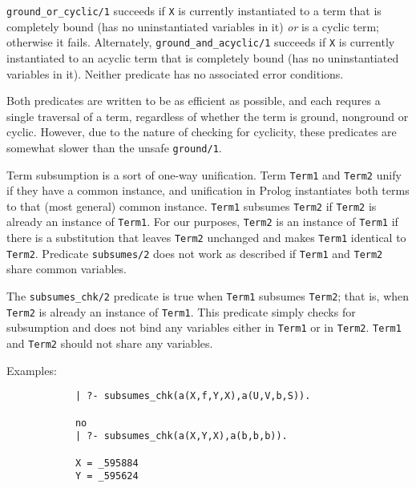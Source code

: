 \begin{description}
%
{\tt ground\_or\_cyclic/1} succeeds if {\tt X} is currently
instantiated to a term that is completely bound (has no uninstantiated
variables in it) {\em or} is a cyclic term; otherwise it fails.
Alternately, {\tt ground\_and\_acyclic/1} succeeds if {\tt X} is
currently instantiated to an acyclic term that is completely bound
(has no uninstantiated variables in it).  Neither predicate has no
associated error conditions.

Both predicates are written to be as efficient as possible, and each
requres a single traversal of a term, regardless of whether the term
is ground, nonground or cyclic.  However, due to the nature of
checking for cyclicity, these predicates are somewhat slower than the
unsafe {\tt ground/1}.

    Term subsumption is a sort of one-way unification.  Term {\tt Term1}
    and {\tt Term2} unify if they have a common instance, and unification
    in Prolog instantiates both terms to that (most general) common instance.
    {\tt Term1} subsumes {\tt Term2} if {\tt Term2} is already an instance of
    {\tt Term1}.  For our purposes, {\tt Term2} is an instance of {\tt Term1}
    if there is a substitution that leaves {\tt Term2} unchanged and makes
    {\tt Term1} identical to {\tt Term2}.  Predicate {\tt subsumes/2} does
    not work as described if {\tt Term1} and {\tt Term2} share common
    variables.

%
%
    The {\tt subsumes\_chk/2} predicate is true when {\tt Term1} subsumes 
    {\tt Term2}; that is, when {\tt Term2} is already an instance of
    {\tt Term1}.  This predicate simply checks for subsumption and 
    does not bind any variables either in {\tt Term1} or in {\tt Term2}.
    {\tt Term1} and {\tt Term2} should not share any variables.

    Examples:
    {\footnotesize
     \begin{verbatim}
            | ?- subsumes_chk(a(X,f,Y,X),a(U,V,b,S)).

            no
            | ?- subsumes_chk(a(X,Y,X),a(b,b,b)).

            X = _595884
            Y = _595624
     \end{verbatim}}


\end{description}
